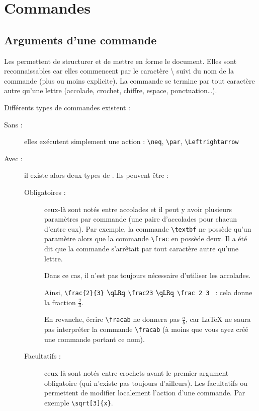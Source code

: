 \section{Commandes}
\subsection{Arguments d'une commande}
Les  permettent de structurer et de mettre en forme le document. Elles sont reconnaissables car elles commencent par le caractère \textbackslash{} suivi du nom de la commande (plus ou moins explicite). La commande se termine par tout caractère autre qu'une lettre (accolade, crochet, chiffre, espace, ponctuation\dots).\par

Différents types de commandes existent :
\begin{description}
    \item[Sans  :] elles exécutent simplement une action : \verb!\neq!, \verb!\par!, \verb!\Leftrightarrow!
    \item[Avec  :] il existe alors deux types de . Ils peuvent être :
        \begin{description}
            \item[Obligatoires :] ceux-là sont notés entre accolades et il peut y avoir plusieurs paramètres par commande (une paire d'accolades pour chacun d'entre eux). Par exemple, la commande \verb!\textbf! ne possède qu'un paramètre alors que la commande \verb!\frac! en possède deux. Il a été dit que la commande s'arrêtait par tout caractère autre qu'une lettre. 
            
Dans ce cas, il n'est pas toujours nécessaire d'utiliser les accolades. 

Ainsi, \verb!\frac{2}{3}! $\qLRq$ \verb!\frac23! $\qLRq$ \verb!\frac 2 3 ! : cela donne la fraction $\textstyle \frac23$. 

En revanche, écrire \verb!\fracab! ne donnera pas $\textstyle \frac a b$, car \LaTeX{} ne saura pas interpréter la commande \verb!\fracab! (à moins que vous ayez créé une commande portant ce nom).

            \item[Facultatifs :] ceux-là sont notés entre crochets avant le premier argument obligatoire (qui n'existe pas toujours d'ailleurs). Les  facultatifs ou  permettent de modifier localement l'action d'une commande. Par exemple \verb!\sqrt[3]{x}!.
        \end{description}
\end{description}

